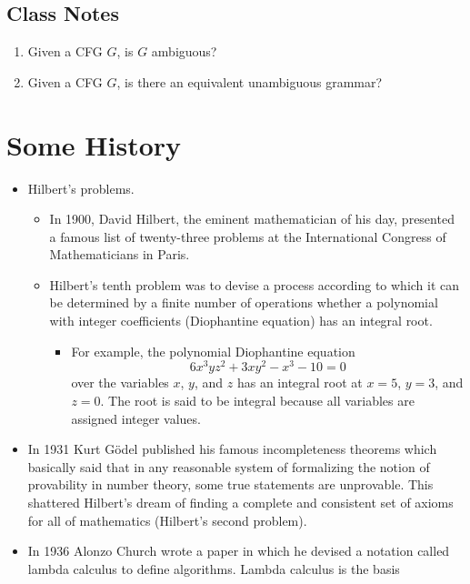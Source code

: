 \documentclass[]{article}
\begin{document}
  \subsection*{Class Notes}
    \begin{enumerate}
      \item Given a CFG $G$, is $G$ ambiguous?
      \item Given a CFG $G$, is there an equivalent unambiguous grammar?
    \end{enumerate}

\section{Some History}
  \begin{itemize}
    \item Hilbert's problems.
      \begin{itemize}
        \item In 1900, David Hilbert, the eminent mathematician of his day, 
        presented a famous list of twenty-three problems at the International 
        Congress of Mathematicians in Paris.
        \item Hilbert's tenth problem was to devise a process according to 
        which it can be determined by a finite number of operations whether a 
        polynomial with integer coefficients (Diophantine equation) has an 
        integral root.
          \begin{itemize}
            \item For example, the polynomial Diophantine equation
              \[ 6x^3yz^2 + 3xy^2 - x^3 - 10 = 0 \]
            over the variables $x$, $y$, and $z$ has an integral root at 
            $x = 5$, $y = 3$, and $z = 0$. The root is said to be integral 
            because all variables are assigned integer values.
          \end{itemize}
      \end{itemize}
    \item In 1931 Kurt G\"odel published his famous incompleteness theorems
    which basically said that in any reasonable system of formalizing the 
    notion of provability in number theory, some true statements are 
    unprovable. This shattered Hilbert's dream of finding a complete and 
    consistent set of axioms for all of mathematics (Hilbert's second problem).
    \item In 1936 Alonzo Church wrote a paper in which he devised a notation
    called lambda calculus to define algorithms. Lambda calculus is the basis

\end{itemize}
\end{document}

